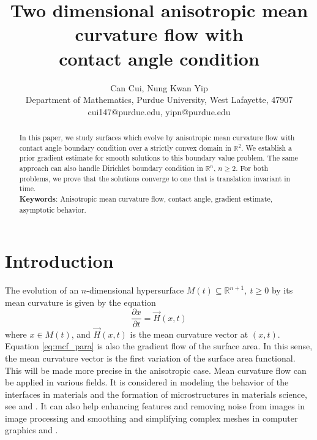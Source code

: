 \documentclass[12pt]{article}
\numberwithin{equation}{section}
\theoremstyle{plain}
\theoremstyle{definition}
\theoremstyle{remark}
\begin{document}
\title{Two dimensional anisotropic mean curvature flow with\\contact angle condition}
\date{}

\author{Can Cui, Nung Kwan Yip \\
Department of Mathematics, Purdue University, West Lafayette, 47907 \\
cui147@purdue.edu, yipn@purdue.edu
}




\maketitle

\begin{abstract}
In this paper, we study surfaces which evolve by anisotropic mean curvature flow with contact angle boundary condition over a strictly convex domain in $\mathbb{R}^2$. We establish a prior gradient estimate for smooth solutions to this boundary value problem. The same approach can also handle Dirichlet boundary condition in $\mathbb{R}^n$, $n\geq 2$. For both problems, we prove that the solutions converge to one that is translation invariant in time.\\

\noindent
\textbf{Keywords}: Anisotropic mean curvature flow, contact angle, gradient estimate, asymptotic behavior.
\end{abstract}

\section{Introduction}
The evolution of an $n$-dimensional hypersurface $M(t) \subseteq \mathbb{R}^{n+1},\ t\geq 0$ by its mean curvature is given by the equation
\begin{equation} \label{eq:mcf_para}
\frac{\partial x}{\partial t}=\Vec{H}(x,t)
\end{equation}
where $x\in M(t)$, and $\Vec{H}(x,t)$ is the mean curvature vector at $(x,t)$. 
Equation \eqref{eq:mcf_para} is also the gradient flow of the surface area. In this sense, 
the mean curvature vector is the first variation of the surface area functional. 
This will be made more precise in the anisotropic case.
Mean curvature flow can be applied in various fields. It is considered in modeling the behavior of the interfaces in materials and the formation of microstructures in materials science, see \cite{Mu} and \cite{Ta}. It can also help enhancing features and removing noise from images in image processing and smoothing and simplifying complex meshes in computer graphics \cite{AGLM} and \cite{desbrun1999implicit}.
\end{document}
